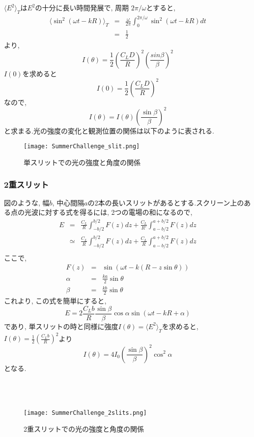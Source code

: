 $\langle E^2\rangle_T$は$E^2$の十分に長い時間発展で, 周期 $2\pi / \omega$とすると, 
\begin{eqnarray*}
  \langle \sin^2(\omega t - kR)\rangle_T  &=& \frac{\omega}{2\pi} \int_{0}^{2\pi / \omega} \sin^2(\omega t - kR) dt \\
  &=& \frac{1}{2}
\end{eqnarray*}
より, 
\[
  I(\theta) = \frac{1}{2} \left(\frac{C_L D}{R}\right)^2 \left(\frac{sin \beta}{\beta}\right)^2
\]
$I(0)$を求めると
\[
  I(0) = \frac{1}{2} \left(\frac{C_L D}{R}\right)^2
\]
なので, 
\[
  I(\theta) = I(\theta) \left(\frac{\sin \beta}{\beta}\right)^2
\]
と求まる.光の強度の変化と観測位置の関係は以下のように表される.\\

\begin{figure}[h]
  \begin{center}
    \texttt{[image: SummerChallenge\_slit.png]}
    \caption{単スリットでの光の強度と角度の関係}
  \end{center}
\end{figure}

\clearpage

\subsubsection{2重スリット}
図のような, 幅$b$, 中心間隔$a$の2本の長いスリットがあるとする.スクリーン上のある点の光波に対する式を得るには, 2つの電場の和になるので, 
\begin{eqnarray*}
  E &=& \frac{C_L}{R} \int_{-b/2}^{b/2} F(z) dz + \frac{C_L}{R'} \int_{a-b/2}^{a+b/2} F(z) dz \\
  &\simeq& \frac{C_L}{R} \int_{-b/2}^{b/2} F(z) dz + \frac{C_L}{R} \int_{a-b/2}^{a+b/2} F(z) dz \\
\end{eqnarray*}
ここで, 
\begin{eqnarray*}
  F(z) &=& \sin(\omega t - k(R-z\sin\theta)) \\
  \alpha &=& \frac{ka}{2} \sin\theta \\
  \beta &=& \frac{kb}{2} \sin\theta
\end{eqnarray*}
これより, この式を簡単にすると, 
\[
  E = 2 \frac{C_L b}{R} \frac{\sin\beta}{\beta} \cos\alpha \sin(\omega t -kR + \alpha)
\]
であり, 単スリットの時と同様に強度$I(\theta) = \langle E^2\rangle_T$を求めると, $I(\theta) = \frac{1}{2} (\frac{C_L b}{R})^2$より
\[
  I(\theta) = 4I_0 \left(\frac{\sin \beta}{\beta}\right)^2 \cos^2 \alpha
\]
となる.\\
\\
\\
\\
\begin{figure}[h]
  \begin{center}
    \texttt{[image: SummerChallenge\_2slits.png]}
    \caption{2重スリットでの光の強度と角度の関係}
  \end{center}
\end{figure}

